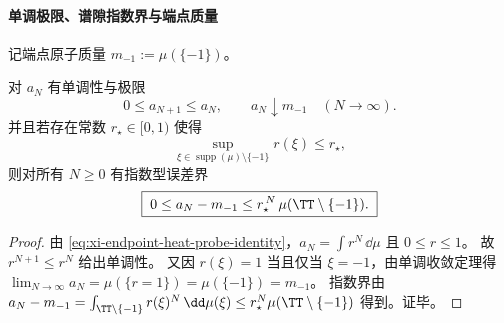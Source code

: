 \paragraph{单调极限、谱隙指数界与端点质量}
记端点原子质量 \(m_{-1}:=\mu(\{-1\})\)。

\begin{corollary}[端点质量的单调读出与谱隙指数界]\label{cor:xi-endpoint-heat-probe-monotone-limit-gap}
对 \(a_N\) 有单调性与极限
\begin{equation}\label{eq:xi-endpoint-heat-probe-monotone-limit}
\boxed{\;
0\le a_{N+1}\le a_N,\qquad
a_N\downarrow m_{-1}\quad(N\to\infty).\;}
\end{equation}
并且若存在常数 \(r_\star\in[0,1)\) 使得
\[
\sup_{\xi\in\operatorname{supp}(\mu)\setminus\{-1\}}r(\xi)\le r_\star,
\]
则对所有 \(N\ge 0\) 有指数型误差界
\begin{equation}\label{eq:xi-endpoint-heat-probe-gap-exp-bound}
\boxed{\;
0\le a_N-m_{-1}\le r_\star^{\,N}\,\mu(\TT\setminus\{-1\}).\;}
\end{equation}
\end{corollary}
\begin{proof}
由 \eqref{eq:xi-endpoint-heat-probe-identity}，\(a_N=\int r^N\,\dd\mu\) 且 \(0\le r\le 1\)。
故 \(r^{N+1}\le r^N\) 给出单调性。
又因 \(r(\xi)=1\) 当且仅当 \(\xi=-1\)，由单调收敛定理得
\(
\lim_{N\to\infty}a_N=\mu(\{r=1\})=\mu(\{-1\})=m_{-1}
\)。
指数界由
\(
a_N-m_{-1}=\int_{\TT\setminus\{-1\}}r(\xi)^N\,\dd\mu(\xi)\le r_\star^N\mu(\TT\setminus\{-1\})
\)
得到。证毕。
\end{proof}


